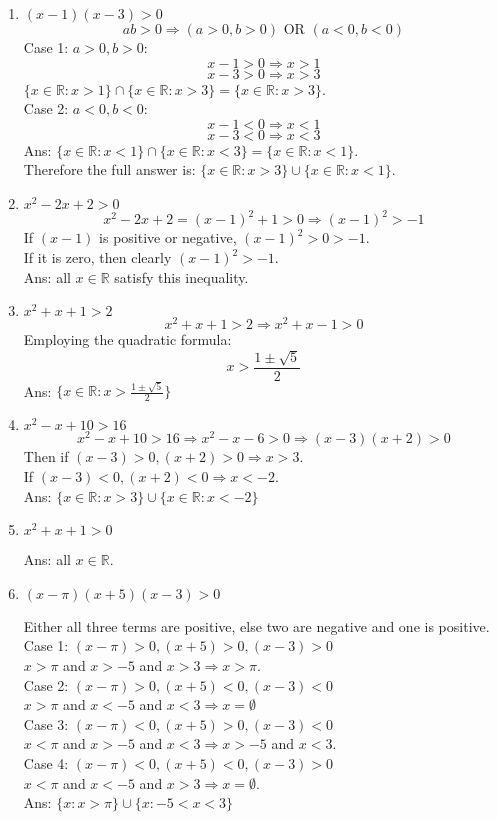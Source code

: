 \documentclass[12pt]{article}
\begin{document}
\begin{enumerate}
\begin{enumerate}
\item $(x - 1)(x - 3) > 0$
$$ ab > 0 \Rightarrow (a > 0, b > 0) \text{ OR } (a < 0, b < 0)$$
Case 1: $a > 0, b > 0$:
$$ x - 1 > 0 \Rightarrow x > 1$$
$$ x - 3 > 0 \Rightarrow x > 3$$
$\{x\in \mathbb{R} : x > 1\} \cap \{x\in \mathbb{R} : x > 3\} = \{x\in \mathbb{R} : x > 3\}$.\\
Case 2: $a < 0, b < 0$:
$$ x - 1 < 0 \Rightarrow x < 1$$
$$ x - 3 < 0 \Rightarrow x < 3$$
Ans: $\{x\in \mathbb{R} : x < 1\} \cap \{x\in \mathbb{R} : x < 3\} = \{x\in \mathbb{R} : x < 1\}$.\\
Therefore the full answer is: $\{x\in \mathbb{R} : x > 3\} \cup \{x\in \mathbb{R} : x < 1\}$.

\item $x^2 - 2x + 2 > 0$
$$ x^2 - 2x + 2 = (x - 1)^2 + 1 > 0 \Rightarrow (x - 1)^2 > -1 $$
If $(x - 1)$ is positive or negative, $(x - 1)^2 > 0 > -1$. \\If it is zero, then clearly $(x - 1)^2 > -1$.\\
Ans: all $x\in \mathbb{R}$ satisfy this inequality.

\item $x^2 + x + 1 > 2$
$$ x^2 + x + 1 > 2 \Rightarrow x^2 + x - 1 > 0$$
Employing the quadratic formula: $$ x > \frac{1 \pm \sqrt{5}}{2}$$
Ans: $\{x\in \mathbb{R} : x > \frac{1 \pm \sqrt{5}}{2}\}$

\item $x^2 - x + 10 > 16$
$$x^2 - x + 10 > 16 \Rightarrow x^2 - x - 6 > 0 \Rightarrow (x -3)(x + 2) > 0$$
Then if $(x - 3) > 0, (x + 2) > 0 \Rightarrow x > 3$.\\ 
If $(x - 3) < 0, (x + 2) < 0 \Rightarrow x < -2$.\\
Ans: $\{x\in \mathbb{R} : x > 3\} \cup \{x\in \mathbb{R} : x < -2\}$

\item $x^2 + x + 1 > 0$

Ans: all $x\in \mathbb{R}$.

\item $(x - \pi)(x + 5)(x - 3) > 0$

Either all three terms are positive, else two are negative and one is positive.\\
Case 1: 
$(x - \pi) > 0, (x + 5) > 0, (x - 3) > 0$\\
$x > \pi$ and $x > -5$ and $x > 3 \Rightarrow x > \pi$.\\
Case 2:
$(x - \pi) > 0, (x + 5) < 0, (x - 3) < 0$\\
$x > \pi$ and $x < -5$ and $x < 3 \Rightarrow x = \emptyset$\\
Case 3:
$(x - \pi) < 0, (x + 5) > 0, (x - 3) < 0$\\
$x < \pi$ and $x > -5$ and $x < 3 \Rightarrow x > -5$ and $x < 3$.\\
Case 4:
$(x - \pi) < 0, (x + 5) < 0, (x - 3) > 0$\\
$x < \pi$ and $x < -5$ and $x > 3 \Rightarrow x = \emptyset$.\\
Ans: $\{x :  x > \pi\} \cup \{x : -5 < x < 3\}$


\end{enumerate}
\end{enumerate}
\end{document}

